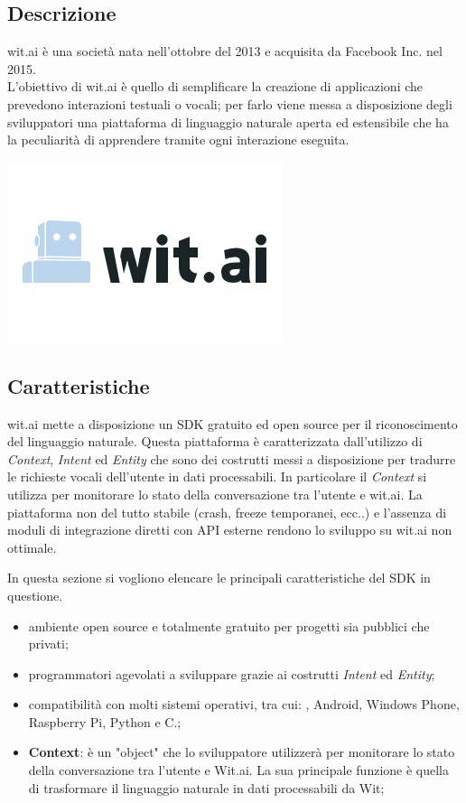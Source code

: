 \documentclass[a4paper,titlepage]{article}
\begin{document}
	\subsection{Descrizione}
		\begin{minipage}{0.7\textwidth}\raggedright
			wit.ai è una società nata nell'ottobre del 2013 e acquisita da Facebook Inc. nel 2015. \\
			L'obiettivo di wit.ai è quello di semplificare la creazione di applicazioni che prevedono interazioni testuali o vocali; per farlo viene messa a disposizione degli sviluppatori una piattaforma di linguaggio naturale aperta ed estensibile che ha la peculiarità di apprendere tramite ogni interazione eseguita.
		\end{minipage}
		\hfill
		\noindent\begin{minipage}{0.15\textwidth}
		\includegraphics[scale=0.6]{images/witai.jpg}
		\end{minipage}
		\subsection{Caratteristiche}

			wit.ai mette a disposizione un SDK gratuito ed open source per il riconoscimento del linguaggio naturale. Questa piattaforma è caratterizzata dall'utilizzo di \textit{Context}, \textit{Intent} ed \textit{Entity} che sono dei costrutti messi a disposizione per tradurre le richieste vocali dell'utente in dati processabili. In particolare il \textit{Context} si utilizza per monitorare lo stato della conversazione tra l'utente e wit.ai.
			La piattaforma non del tutto stabile (crash, freeze temporanei, ecc..) e l'assenza di moduli di integrazione diretti con API esterne rendono lo sviluppo su wit.ai non ottimale.

In questa sezione si vogliono elencare le principali caratteristiche del SDK in questione.
\begin{itemize}
	\item ambiente open source e totalmente gratuito per progetti sia pubblici che privati;
	\item programmatori agevolati a sviluppare grazie ai costrutti \textit{Intent} ed \textit{Entity}; 
	\item compatibilità con molti sistemi operativi, tra cui: , Android, Windows Phone, Raspberry Pi, Python e C.;
	\item \textbf{Context}: è un "object" che lo sviluppatore utilizzerà per monitorare lo stato della conversazione tra l'utente e Wit.ai. La sua principale funzione è quella di trasformare il linguaggio naturale in dati processabili da Wit;
	
\end{itemize}	
\end{document}
